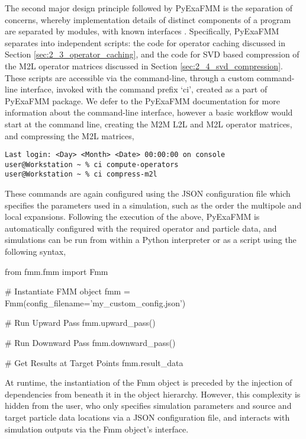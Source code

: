 The second major design principle followed by \gls{PyExaFMM} is
the separation of concerns, whereby implementation details of distinct
components of a program are separated by modules, with known interfaces
\cite{Gamma:1994:Addison}. Specifically, \gls{PyExaFMM} separates into independent
scripts: the code for operator caching discussed in Section \ref{sec:2_3_operator_caching},
and the code for SVD based compression of the M2L operator matrices discussed in
Section \ref{sec:2_4_svd_compression}. These scripts are accessible via the
command-line, through a custom command-line interface, invoked with the command
prefix `ci', created as a part of \gls{PyExaFMM} package. We defer to the \gls{PyExaFMM}
documentation for more information about the command-line interface, however a
basic workflow would start at the command line, creating the \gls{M2M}
\gls{L2L} and \gls{M2L} operator matrices, and compressing the \gls{M2L} matrices,

\begin{verbatim}
Last login: <Day> <Month> <Date> 00:00:00 on console
user@Workstation ~ % ci compute-operators
user@Workstation ~ % ci compress-m2l
\end{verbatim}

These commands are again configured using the \gls{JSON} configuration file
which specifies the parameters used in a simulation, such as the order the
multipole and local expansions. Following the execution of the above,
\gls{PyExaFMM} is automatically configured with the required
operator and particle data, and simulations can be run from within a Python
interpreter or as a script using the following syntax,

\begin{python}
from fmm.fmm import Fmm

# Instantiate FMM object
fmm = Fmm(config_filename='my_custom_config.json')

# Run Upward Pass
fmm.upward_pass()

# Run Downward Pass
fmm.downward_pass()

# Get Results at Target Points
fmm.result_data
\end{python}

At runtime, the instantiation of the Fmm object is preceded by the injection of
dependencies from beneath it in the object hierarchy. However, this complexity is
hidden from the user, who only specifies simulation parameters and source
and target particle data locations via a \gls{JSON} configuration file, and interacts
with simulation outputs via the Fmm object's interface.

